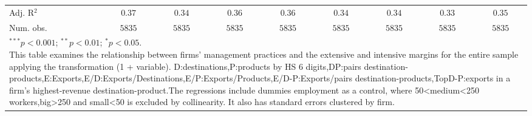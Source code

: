 \documentclass{article}
\begin{document}
\begin{table}
\begin{center}
\begin{small}
\begin{tabular}{l c c c c c c c c}
Adj. R$^2$ & $0.37$       & $0.34$       & $0.36$       & $0.36$       & $0.34$       & $0.34$       & $0.33$       & $0.35$       \\
Num. obs.  & $5835$       & $5835$       & $5835$       & $5835$       & $5835$       & $5835$       & $5835$       & $5835$       \\
\hline
\multicolumn{9}{l}{\tiny{\parbox{1\linewidth}{\vspace{3pt}$^{***}p<0.001$; $^{**}p<0.01$; $^{*}p<0.05$. \\This table examines the relationship between firms' management practices and the extensive and intensive margins for the entire sample applying the transformation (1 + variable). D:destinations,P:products by HS 6 digits,DP:pairs destination-products,E:Exports,E/D:Exports/Destinations,E/P:Exports/Products,E/D-P:Exports/pairs destination-products,TopD-P:exports in a firm's highest-revenue destination-product.The regressions include dummies employment as a control, where 50<medium<250 workers,big>250 and small<50 is excluded by collinearity. It also has standard errors clustered by firm.}}}
\end{tabular}
\end{small}
\label{table:coefficients}
\end{center}
\end{table}
\end{document}
